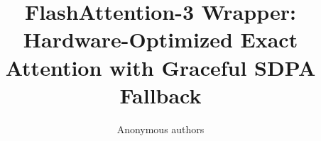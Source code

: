 \title{\textbf{FlashAttention-3 Wrapper: Hardware-Optimized Exact Attention with Graceful SDPA Fallback}}

\author{Anonymous authors}
